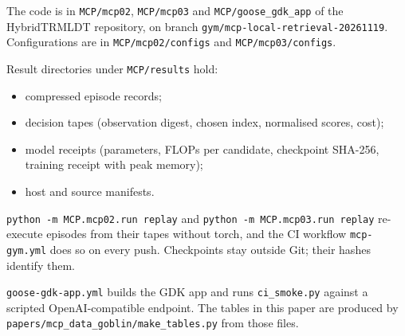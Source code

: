 The code is in \texttt{MCP/mcp02}, \texttt{MCP/mcp03} and \texttt{MCP/goose\_gdk\_app} of the HybridTRMLDT repository,
on branch \texttt{gym/mcp-local-retrieval-20261119}. Configurations are in \texttt{MCP/mcp02/configs} and
\texttt{MCP/mcp03/configs}.

Result directories under \texttt{MCP/results} hold:
\begin{itemize}
\item compressed episode records;
\item decision tapes (observation digest, chosen index, normalised scores, cost);
\item model receipts (parameters, FLOPs per candidate, checkpoint SHA-256, training receipt with peak memory);
\item host and source manifests.
\end{itemize}
\texttt{python -m MCP.mcp02.run replay} and \texttt{python -m MCP.mcp03.run replay} re-execute episodes from their tapes
without torch, and the CI workflow \texttt{mcp-gym.yml} does so on every push. Checkpoints stay outside Git; their
hashes identify them.

\texttt{goose-gdk-app.yml} builds the GDK app and runs \texttt{ci\_smoke.py} against a scripted OpenAI-compatible
endpoint. The tables in this paper are produced by \texttt{papers/mcp\_data\_goblin/make\_tables.py} from those files.

